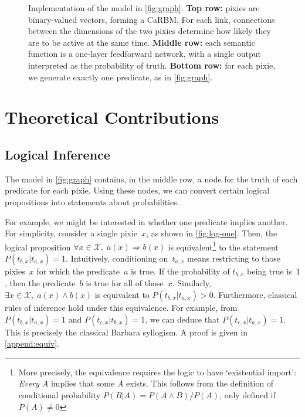 \documentclass[11pt]{article}
\begin{document}
\begin{figure}
\begin{tikzpicture}[default]
\end{tikzpicture}
\vspace*{-3mm}

\caption{Implementation of the model in \cref{fig:graph}.\linebreak
\textbf{Top row:} pixies are binary-valued vectors,
forming a CaRBM.
For each link,
connections between the dimensions of the two pixies
determine how likely they are to be active at the same time.\linebreak
\textbf{Middle row:} each semantic function is a one-layer feedforward network,
with a single output interpreted as the probability of truth. \linebreak
\textbf{Bottom row:} for each pixie, we generate exactly one predicate,
as in \cref{fig:graph}.
}
\label{fig:imp}
\vspace*{-3mm}

\end{figure}


\section{Theoretical Contributions}
\label{sec:theory}

\subsection{Logical Inference}
\label{sec:log}

The model in \cref{fig:graph} contains, in the middle row,
a node for the truth of each predicate for each pixie.
Using these nodes, we can convert certain logical propositions
into statements about probabilities.

For example, we might be interested in whether one predicate implies another.
For simplicity, consider a single pixie~$x$, as shown in \cref{fig:log-one}.
Then, the logical proposition ${\forall x\in\mathcal{X},\; a(x) \Rightarrow b(x)}$\linebreak
is equivalent\footnote{%
  More precisely, the equivalence requires the logic to have `existential import':
  \textit{Every A} implies that some \textit{A} exists.
  This follows from the definition of conditional probability
  $P(B|A)=P(A\wedge B)/P(A)$, only defined if $P(A)\neq 0$
} %
to the statement ${P(t_{b,x}|t_{a,x}) = 1}$.\linebreak
Intuitively, conditioning on~$t_{a,x}$ means restricting to those pixies~$x$
for which the predicate~$a$ is true.
If the probability of $t_{b,x}$ being true is~$1$,
then the predicate~$b$ is true for all of those~$x$.
Similarly, ${\exists x\in\mathcal{X},\; a(x) \land b(x)}$
is equivalent to ${P(t_{b,x}|t_{a,x}) > 0}$.
Furthermore, classical rules of inference hold under this equivalence.
For example, from ${P(t_{b,x}|t_{a,x}) = 1}$ and ${P(t_{c,x}|t_{b,x}) = 1}$,
we can deduce that ${P(t_{c,x}|t_{a,x}) = 1}$.
This is precisely the classical Barbara syllogism.
A proof is given in \cref{append:equiv}.
\end{document}

